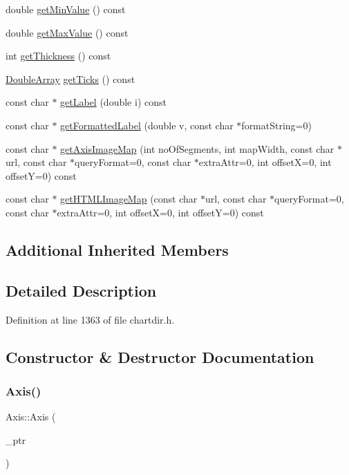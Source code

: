 \begin{DoxyCompactItemize}
\item 
double \hyperlink{class_axis_a2a1c7c42965a0689314845e17ac8606d}{get\+Min\+Value} () const
\item 
double \hyperlink{class_axis_a0712caf5b1b2dc5349c4ad4e95ba63cc}{get\+Max\+Value} () const
\item 
int \hyperlink{class_axis_a11de5c65bb39d2ad0f00def9adc9fec1}{get\+Thickness} () const
\item 
\hyperlink{class_double_array}{Double\+Array} \hyperlink{class_axis_a32d922936b68fc6b201dbe6faa08c905}{get\+Ticks} () const
\item 
const char $\ast$ \hyperlink{class_axis_aaf144ea75fa846472c72382e097b50a4}{get\+Label} (double i) const
\item 
const char $\ast$ \hyperlink{class_axis_a6a1b1952bcb2281243fe16470d814f9c}{get\+Formatted\+Label} (double v, const char $\ast$format\+String=0)
\item 
const char $\ast$ \hyperlink{class_axis_a27273baa6bef81839474b96f3560e003}{get\+Axis\+Image\+Map} (int no\+Of\+Segments, int map\+Width, const char $\ast$url, const char $\ast$query\+Format=0, const char $\ast$extra\+Attr=0, int offsetX=0, int offsetY=0) const
\item 
const char $\ast$ \hyperlink{class_axis_a278e6559be3e7201f1e6e986f4562042}{get\+H\+T\+M\+L\+Image\+Map} (const char $\ast$url, const char $\ast$query\+Format=0, const char $\ast$extra\+Attr=0, int offsetX=0, int offsetY=0) const
\end{DoxyCompactItemize}
\subsection*{Additional Inherited Members}


\subsection{Detailed Description}


Definition at line 1363 of file chartdir.\+h.



\subsection{Constructor \& Destructor Documentation}
\mbox{\label{class_axis_abc375bb09916fa2c60579810e1a3c53f}} 
\subsubsection{\texorpdfstring{Axis()}{Axis()}}
{\footnotesize\ttfamily Axis\+::\+Axis (\begin{DoxyParamCaption}\item[{Axis\+Internal $\ast$}]{\+\_\+ptr }\end{DoxyParamCaption})\hspace{0.3cm}{\ttfamily [inline]}}




